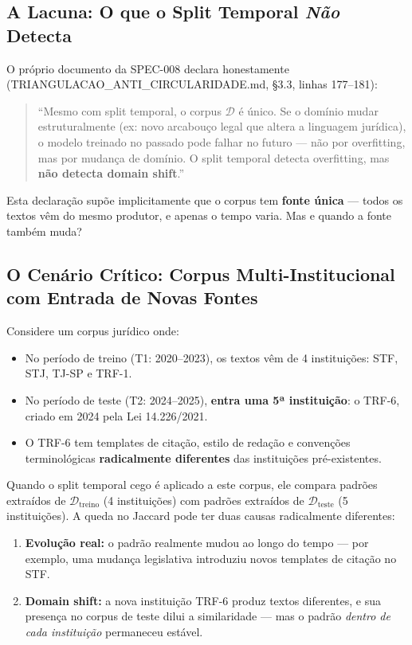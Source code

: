 \documentclass[12pt,a4paper]{article}
\theoremstyle{remark}
\begin{document}
\subsection{A Lacuna: O que o Split Temporal \emph{Não} Detecta}

O próprio documento da SPEC-008 declara honestamente (TRIANGULACAO\_ANTI\_CIRCULARIDADE.md, §3.3, linhas 177--181):

\begin{quote}
``Mesmo com split temporal, o corpus $\mathcal{D}$ é único. Se o domínio mudar estruturalmente (ex: novo arcabouço legal que altera a linguagem jurídica), o modelo treinado no passado pode falhar no futuro — não por overfitting, mas por mudança de domínio. O split temporal detecta overfitting, mas \textbf{não detecta domain shift}.''
\end{quote}

Esta declaração supõe implicitamente que o corpus tem \textbf{fonte única} — todos os textos vêm do mesmo produtor, e apenas o tempo varia. Mas e quando a fonte também muda?

\subsection{O Cenário Crítico: Corpus Multi-Institucional com Entrada de Novas Fontes}

Considere um corpus jurídico onde:

\begin{itemize}[nosep]
  \item No período de treino (T1: 2020--2023), os textos vêm de 4 instituições: STF, STJ, TJ-SP e TRF-1.
  \item No período de teste (T2: 2024--2025), \textbf{entra uma 5ª instituição}: o TRF-6, criado em 2024 pela Lei 14.226/2021.
  \item O TRF-6 tem templates de citação, estilo de redação e convenções terminológicas \textbf{radicalmente diferentes} das instituições pré-existentes.
\end{itemize}

Quando o split temporal cego é aplicado a este corpus, ele compara padrões extraídos de $\mathcal{D}_{\text{treino}}$ (4 instituições) com padrões extraídos de $\mathcal{D}_{\text{teste}}$ (5 instituições). A queda no Jaccard pode ter duas causas radicalmente diferentes:

\begin{enumerate}[label=(\alph*), nosep]
  \item \textbf{Evolução real:} o padrão realmente mudou ao longo do tempo — por exemplo, uma mudança legislativa introduziu novos templates de citação no STF.
  \item \textbf{Domain shift:} a nova instituição TRF-6 produz textos diferentes, e sua presença no corpus de teste dilui a similaridade — mas o padrão \emph{dentro de cada instituição} permaneceu estável.
\end{enumerate}
\end{document}
